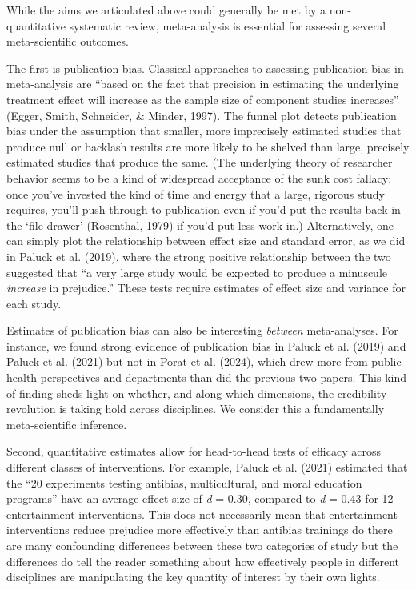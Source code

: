 \documentclass[
  ,jou]{apa6}
\begin{document}
While the aims we articulated above could generally be met by a non-quantitative systematic review, meta-analysis is essential for assessing several meta-scientific outcomes.

The first is publication bias. Classical approaches to assessing publication bias in meta-analysis are ``based on the fact that precision in estimating the underlying treatment effect will increase as the sample size of component studies increases'' (Egger, Smith, Schneider, \& Minder, 1997). The funnel plot detects publication bias under the assumption that smaller, more imprecisely estimated studies that produce null or backlash results are more likely to be shelved than large, precisely estimated studies that produce the same. (The underlying theory of researcher behavior seems to be a kind of widespread acceptance of the sunk cost fallacy: once you've invested the kind of time and energy that a large, rigorous study requires, you'll push through to publication even if you'd put the results back in the `file drawer' (Rosenthal, 1979) if you'd put less work in.) Alternatively, one can simply plot the relationship between effect size and standard error, as we did in Paluck et al. (2019), where the strong positive relationship between the two suggested that ``a very large study would be expected to produce a minuscule \emph{increase} in prejudice.'' These tests require estimates of effect size and variance for each study.

Estimates of publication bias can also be interesting \emph{between} meta-analyses. For instance, we found strong evidence of publication bias in Paluck et al. (2019) and Paluck et al. (2021) but not in Porat et al. (2024), which drew more from public health perspectives and departments than did the previous two papers. This kind of finding sheds light on whether, and along which dimensions, the credibility revolution is taking hold across disciplines. We consider this a fundamentally meta-scientific inference.

Second, quantitative estimates allow for head-to-head tests of efficacy across different classes of interventions. For example, Paluck et al. (2021) estimated that the ``20 experiments testing antibias, multicultural, and moral education programs'' have an average effect size of \emph{d} = 0.30, compared to \emph{d} = 0.43 for 12 entertainment interventions. This does not necessarily mean that entertainment interventions reduce prejudice more effectively than antibias trainings do \textemdash there are many confounding differences between these two categories of study \textemdash but the differences do tell the reader something about how effectively people in different disciplines are manipulating the key quantity of interest by their own lights.
\end{document}
